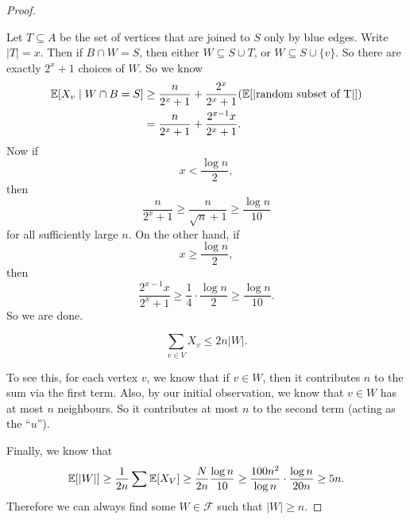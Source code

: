 \documentclass[a4paper]{article}
\begin{document}
\begin{proof}
\begin{center}
  \end{center}
  Let $T \subseteq A$ be the set of vertices that are joined to $S$ only by blue edges. Write $|T| = x$. Then if $B \cap W = S$, then either $W \subseteq S \cup T$, or $W \subseteq S \cup \{v\}$. So there are exactly $2^x + 1$ choices of $W$. So we know
  \begin{align*}
    \mathbb{E}[X_v \mid W \cap B = S] &\geq \frac{n}{2^x + 1} + \frac{2^x}{2^x + 1}(\mathbb{E}[|\text{random subset of T}|])\\
    &= \frac{n}{2^x + 1} + \frac{2^{x - 1}x}{2^x + 1}.
  \end{align*}
  Now if
  \[
    x < \frac{\log n}{2},
  \]
  then
  \[
    \frac{n}{2^x + 1} \geq \frac{n}{\sqrt{n} + 1} \geq \frac{\log n}{10}
  \]
  for all sufficiently large $n$. On the other hand, if
  \[
    x \geq \frac{\log n}{2},
  \]
  then
  \[
    \frac{2^{x - 1}x}{2^x + 1} \geq \frac{1}{4} \cdot \frac{\log n}{2} \geq \frac{\log n}{10}.
  \]
  So we are done.

  \begin{claim}
    \[
      \sum_{v \in V} X_v \leq 2n |W|.
    \]
  \end{claim}
  To see this, for each vertex $v$, we know that if $v \in W$, then it contributes $n$ to the sum via the first term. Also, by our initial observation, we know that $v \in W$ has at most $n$ neighbours. So it contributes at most $n$ to the second term (acting as the ``$u$'').

  Finally, we know that
  \[
    \mathbb{E}[|W|] \geq \frac{1}{2n} \sum \mathbb{E}[X_V] \geq \frac{N}{2n} \frac{\log n}{10} \geq \frac{100n^2}{\log n} \cdot \frac{\log n}{20 n} \geq 5n.
  \]
  Therefore we can always find some $W \in \mathcal{F}$ such that $|W| \geq n$.
\end{proof}
\end{document}
